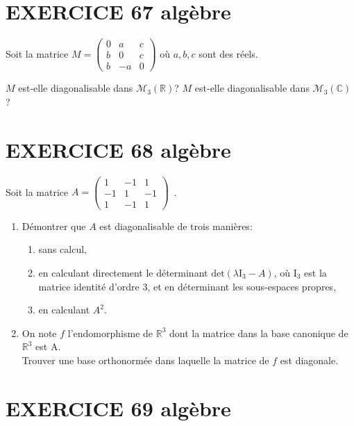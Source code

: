 \documentclass[10pt,oneside]{article}
\begin{document}
\begin{flushleft}
\begin{enumerate}
\end{enumerate}




\section*{EXERCICE 67 \: algèbre}

Soit la matrice $M=\begin{pmatrix}
0 & a & c \\ 
b & 0 & c \\ 
b & -a & 0
\end{pmatrix}$ o\`{u} $a,b,c$ sont des r\'{e}els.


 $M$ est-elle diagonalisable dans $\mathcal{M}_{3}\left(\mathbb{R}\right)$?
 $M$ est-elle diagonalisable dans $\mathcal{M}_{3}\left( \mathbb{C}\right)$?



\section*{EXERCICE 68 \: algèbre }

Soit la matrice $A=\begin{pmatrix}
1 & -1 & 1 \\ 
-1 & 1 & -1 \\ 
1 & -1 & 1
\end{pmatrix}$~.
\begin{enumerate}
\item Démontrer que $A$ est diagonalisable de trois manières:
	\begin{enumerate}
	\item sans calcul, \:\:\:\:
	\item en calculant directement le déterminant $\text{det}(\lambda \mathrm{I}_3-A)$, où $\mathrm{I}_3$ est la matrice identité d'ordre 3, et en déterminant les sous-espaces propres,\:\:\:\:

	\item en calculant $A^2$.\:\:\:\:
	\end{enumerate}
\item
On note $f$ l'endomorphisme de $\mathbb{R}^3$ dont la matrice dans la base canonique de $\mathbb{R}^3$ est A.\\

 Trouver une base orthonormée dans laquelle la matrice de $f$ est diagonale. 

\end{enumerate}

\section*{EXERCICE 69 \: algèbre }


\end{flushleft}
\end{document}

